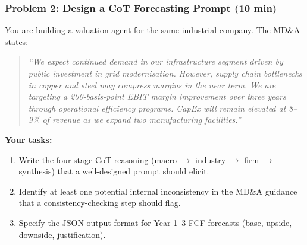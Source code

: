 \documentclass[9pt,t]{beamer}
\begin{document}
\begin{frame}
\frametitle{Problem 2: Design a CoT Forecasting Prompt (10 min)}

You are building a valuation agent for the same industrial company.
The MD\&A states:

\begin{quote}
\footnotesize
\textit{``We expect continued demand in our infrastructure segment driven by public
investment in grid modernisation. However, supply chain bottlenecks in copper and steel
may compress margins in the near term. We are targeting a 200-basis-point EBIT margin
improvement over three years through operational efficiency programs. CapEx will remain
elevated at 8--9\% of revenue as we expand two manufacturing facilities.''}
\end{quote}

\textbf{Your tasks:}
\begin{enumerate}
  \item Write the four-stage CoT reasoning (macro $\to$ industry $\to$ firm $\to$ synthesis)
        that a well-designed prompt should elicit.
  \item Identify at least one potential internal inconsistency in the MD\&A guidance
        that a consistency-checking step should flag.
  \item Specify the JSON output format for Year 1--3 FCF forecasts
        (base, upside, downside, justification).
\end{enumerate}
\end{frame}
\end{document}
